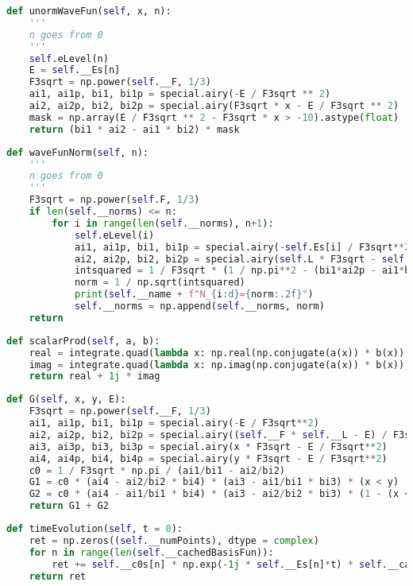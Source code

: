 \begin{lstlisting}[language=Python]
def unormWaveFun(self, x, n):
    '''
    n goes from 0
    '''
    self.eLevel(n)
    E = self.__Es[n]
    F3sqrt = np.power(self.__F, 1/3)
    ai1, ai1p, bi1, bi1p = special.airy(-E / F3sqrt ** 2)
    ai2, ai2p, bi2, bi2p = special.airy(F3sqrt * x - E / F3sqrt ** 2)
    mask = np.array(E / F3sqrt ** 2 - F3sqrt * x > -10).astype(float)
    return (bi1 * ai2 - ai1 * bi2) * mask
\end{lstlisting}

\begin{lstlisting}[language=Python]
def waveFunNorm(self, n):
    '''
    n goes from 0
    '''
    F3sqrt = np.power(self.F, 1/3)
    if len(self.__norms) <= n:
        for i in range(len(self.__norms), n+1):
            self.eLevel(i)
            ai1, ai1p, bi1, bi1p = special.airy(-self.Es[i] / F3sqrt**2)
            ai2, ai2p, bi2, bi2p = special.airy(self.L * F3sqrt - self.Es[i] / F3sqrt**2)
            intsquared = 1 / F3sqrt * (1 / np.pi**2 - (bi1*ai2p - ai1*bi2p * (self.Es[i] - self.L * self.F > -10))**2)
            norm = 1 / np.sqrt(intsquared)
            print(self.__name + f"N_{i:d}={norm:.2f}")
            self.__norms = np.append(self.__norms, norm)
    return
\end{lstlisting}

\begin{lstlisting}[language=Python]
def scalarProd(self, a, b):
    real = integrate.quad(lambda x: np.real(np.conjugate(a(x)) * b(x)), 0, self.__L)[0]
    imag = integrate.quad(lambda x: np.imag(np.conjugate(a(x)) * b(x)), 0, self.__L)[0]
    return real + 1j * imag
\end{lstlisting}

\begin{lstlisting}[language=Python]
def G(self, x, y, E):
    F3sqrt = np.power(self.__F, 1/3)
    ai1, ai1p, bi1, bi1p = special.airy(-E / F3sqrt**2)
    ai2, ai2p, bi2, bi2p = special.airy((self.__F * self.__L - E) / F3sqrt**2)
    ai3, ai3p, bi3, bi3p = special.airy(x * F3sqrt - E / F3sqrt**2)
    ai4, ai4p, bi4, bi4p = special.airy(y * F3sqrt - E / F3sqrt**2)
    c0 = 1 / F3sqrt * np.pi / (ai1/bi1 - ai2/bi2)
    G1 = c0 * (ai4 - ai2/bi2 * bi4) * (ai3 - ai1/bi1 * bi3) * (x < y)
    G2 = c0 * (ai4 - ai1/bi1 * bi4) * (ai3 - ai2/bi2 * bi3) * (1 - (x < y))
    return G1 + G2
\end{lstlisting}

\begin{lstlisting}[language=Python]
def timeEvolution(self, t = 0):
    ret = np.zeros((self.__numPoints), dtype = complex)
    for n in range(len(self.__cachedBasisFun)):
        ret += self.__c0s[n] * np.exp(-1j * self.__Es[n]*t) * self.__cachedBasisFun[n, :]
    return ret
\end{lstlisting}

